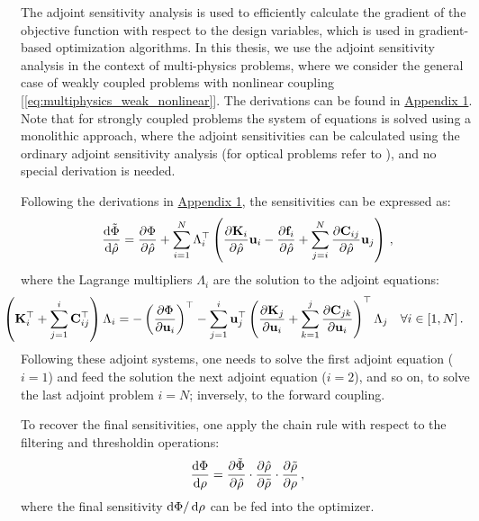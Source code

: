     The adjoint sensitivity analysis is used to efficiently calculate the gradient
    of the objective function with
    respect to the design variables, which is used in gradient-based optimization algorithms. 
    In this thesis, we use the adjoint sensitivity
    analysis  in the context of
    multi-physics problems, where we consider the general case of weakly coupled problems with
    nonlinear coupling [\eqref{eq:multiphysics_weak_nonlinear}]. The derivations can be found in 
    \hyperref[app:appendix1]{Appendix 1}. Note that for strongly coupled problems the system of equations
    is solved using a monolithic approach, where the adjoint sensitivities can be calculated using the
    ordinary adjoint sensitivity analysis (for optical problems refer to \cite{jensen_review}), and no special derivation is needed.

    Following the derivations in \hyperref[app:appendix1]{Appendix 1}, the sensitivities can be expressed 
    as:
    \begin{equation}
        \frac{\mathop{}\!\text{d} \tilde{\Phi}}{\mathop{}\!\text{d} \hat{\rho}}  = \frac{\partial \Phi}{\partial \hat{\rho}} + \sum^N_{i=1} \Lambda_{i}^{\top} \left( \frac{\partial \mathbf{K}_i}{\partial \hat{\rho}} \mathbf{u}_i - \frac{\partial \mathbf{f}_i}{\partial \hat{\rho}} + \sum^N_{j=i} \frac{\partial \mathbf{C}_{ij}}{\partial \hat{\rho}} \mathbf{u}_j \right)\,,
    \end{equation}
    where the Lagrange multipliers $\Lambda_i$ are the solution to the adjoint equations:
    \begin{equation}
        \hspace*{-0.775cm}\left( \mathbf{K}^\top_i + \sum^i_{j=1} \mathbf{C}^\top_{ij} \right) \Lambda_i = -\left(\frac{\partial \Phi}{\partial \mathbf{u}_i}\right)^\top - \sum_{j=1}^{i} \mathbf{u}^\top_j 
        \left(\frac{\partial \mathbf{K}_j}{\partial \mathbf{u}_i} + \sum^{j}_{k=1} \frac{\partial \mathbf{C}_{jk}}{\partial \mathbf{u}_i} \right)^\top \Lambda_j  \quad \forall i \in [1, N] \,.
    \end{equation}
    Following these adjoint systems, one needs to solve the first adjoint equation ($i=1$) 
    and feed the solution the next adjoint equation ($i=2$), and so on, to solve the last adjoint problem $i=N$; inversely, to the forward coupling.

    To recover the final sensitivities, one apply the chain rule with respect to the filtering and thresholdin operations:
    \begin{equation}
        \frac{\mathop{}\!\text{d} \Phi}{\mathop{}\!\text{d} \rho} = \frac{\partial \tilde{\Phi}}{\partial \hat{\rho}} \cdot \frac{\partial \hat{\rho}}{\partial \tilde{\rho}} \cdot \frac{\partial \tilde{\rho}}{\partial \rho}\,,
    \end{equation}
    where the final sensitivity $\mathop{}\!\text{d} \Phi/\mathop{}\!\text{d} \rho$ can be fed into the optimizer.




